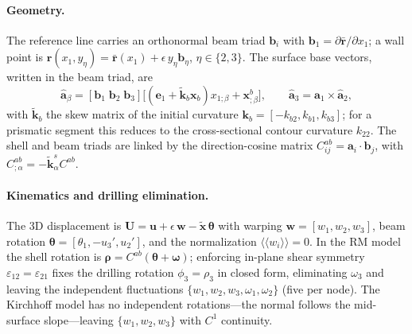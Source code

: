 \documentclass[preprint,12pt]{elsarticle}
\newcommand{\eps}{\varepsilon}
\begin{document}
\paragraph{Geometry.} The reference line carries an orthonormal beam triad
$\bm{b}_i$ with $\bm{b}_1=\partial\bar{\bm{r}}/\partial x_1$; a wall point is
$\bm{r}(x_1,y_\eta)=\bar{\bm{r}}(x_1)+\epsilon\,y_\eta\bm{b}_\eta$,
$\eta\in\{2,3\}$. The surface base vectors, written in the beam triad, are
\begin{equation}
\hat{\bm{a}}_\beta=[\bm{b}_1\;\bm{b}_2\;\bm{b}_3]
\big[(\bm{e}_1+\tilde{\bm{k}}_b\bm{x}_b)x_{1;\beta}+\bm{x}^{b}_{;\beta}\big],
\qquad \hat{\bm{a}}_3=\hat{\bm{a}}_1\times\hat{\bm{a}}_2,
\end{equation}
with $\tilde{\bm{k}}_b$ the skew matrix of the initial curvature
$\bm{k}_b=[-k_{b2},k_{b1},k_{b3}]$; for a prismatic segment this reduces to the
cross-sectional contour curvature $k_{22}$. The shell and beam triads are linked
by the direction-cosine matrix $C^{ab}_{ij}=\bm{a}_i\!\cdot\!\bm{b}_j$, with
$C^{ab}_{;\alpha}=-\tilde{\bm{k}}^{s}_\alpha C^{ab}$.

\paragraph{Kinematics and drilling elimination.} The 3D displacement is
$\bm{U}=\bm{u}+\epsilon\,\bm{w}-\tilde{\bm{x}}\,\bm{\theta}$ with warping
$\bm{w}=[w_1,w_2,w_3]$, beam rotation $\bm{\theta}=[\theta_1,-u_3',u_2']$, and
the normalization $\langle\!\langle w_i\rangle\!\rangle=0$. In the RM model the
shell rotation is $\bm{\rho}=C^{ab}(\bm{\theta}+\bm{\omega})$; enforcing in-plane
shear symmetry $\eps_{12}=\eps_{21}$ fixes the drilling rotation $\phi_3=\rho_3$
in closed form, eliminating $\omega_3$ and leaving the independent fluctuations
$\{w_1,w_2,w_3,\omega_1,\omega_2\}$ (five per node). The Kirchhoff model has no
independent rotations---the normal follows the mid-surface slope---leaving
$\{w_1,w_2,w_3\}$ with $C^1$ continuity.
\end{document}
